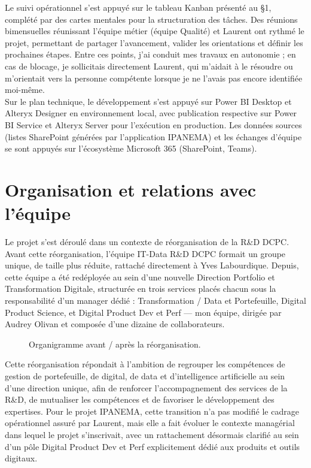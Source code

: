 Le suivi opérationnel s'est appuyé sur le tableau Kanban présenté au §1, complété par 
des cartes mentales pour la structuration des tâches. Des réunions bimensuelles réunissant 
l'équipe métier (équipe Qualité) et Laurent ont rythmé le projet, permettant de partager 
l'avancement, valider les orientations et définir les prochaines étapes. Entre ces points, j'ai 
conduit mes travaux en autonomie ; en cas de blocage, je sollicitais directement Laurent, qui 
m'aidait à le résoudre ou m'orientait vers la personne compétente lorsque je ne l'avais pas 
encore identifiée moi-même. \\

Sur le plan technique, le développement s'est appuyé sur Power BI Desktop et Alteryx 
Designer en environnement local, avec publication respective sur Power BI Service et Alteryx 
Server pour l'exécution en production. Les données sources (listes SharePoint générées par 
l'application IPANEMA) et les échanges d'équipe se sont appuyés sur l'écosystème Microsoft 
365 (SharePoint, Teams). 

\section{Organisation et relations avec l'équipe}

Le projet s'est déroulé dans un contexte de réorganisation de la R\&D DCPC. Avant cette 
réorganisation, l'équipe IT-Data R\&D DCPC formait un groupe unique, de taille plus réduite, 
rattaché directement à Yves Labourdique. Depuis, cette équipe a été redéployée au sein d'une 
nouvelle Direction Portfolio et Transformation Digitale, structurée en trois services placés 
chacun sous la responsabilité d'un manager dédié : Transformation / Data et Portefeuille, 
Digital Product Science, et Digital Product Dev et Perf — mon équipe, dirigée par Audrey 
Olivan et composée d'une dizaine de collaborateurs.

\begin{figure}[H]
    \centering
    \caption{Organigramme avant / après la réorganisation.}
    \label{fig:Organigramme_avant_après_la_réorganisation}
\end{figure}


Cette réorganisation répondait à l'ambition de regrouper les compétences de gestion de 
portefeuille, de digital, de data et d'intelligence artificielle au sein d'une direction unique, afin 
de renforcer l'accompagnement des services de la R\&D, de mutualiser les compétences et de 
favoriser le développement des expertises. Pour le projet IPANEMA, cette transition n'a pas 
modifié le cadrage opérationnel assuré par Laurent, mais elle a fait évoluer le contexte 
managérial dans lequel le projet s'inscrivait, avec un rattachement désormais clarifié au sein 
d'un pôle Digital Product Dev et Perf explicitement dédié aux produits et outils digitaux. \\

